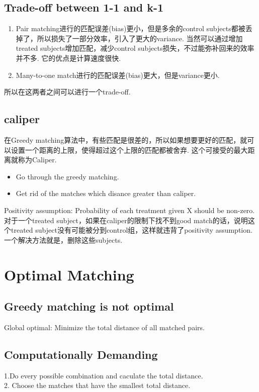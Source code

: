 \subsection{Trade-off between 1-1 and k-1}
\begin{enumerate}[itemindent=2em,label=(\arabic*)] 
	\item Pair matching进行的匹配误差(bias)更小，但是多余的control subjects都被丢掉了，所以损失了一部分效率，引入了更大的variance. 当然可以通过增加treated subjects增加匹配，减少control subjects损失，不过能弥补回来的效率并不多. 它的优点是计算速度很快.
	\item Many-to-one match进行的匹配误差(bias)更大，但是variance更小. 
\end{enumerate}
所以在这两者之间可以进行一个trade-off.

\subsection{caliper}
在Greedy matching算法中，有些匹配是很差的，所以如果想要更好的匹配，就可以设置一个距离的上限，使得超过这个上限的匹配都被舍弃. 这个可接受的最大距离就称为Caliper.
\begin{itemize}
	\item Go through the greedy matching.
	\item Get rid of the matches which disance greater than caliper.
\end{itemize}

Positivity assumption: Probability of each treatment given X should be non-zero.
对于一个treated subject，如果在caliper的限制下找不到good match的话，说明这个treated subject没有可能被分到control组，这样就违背了positivity assumption. 一个解决方法就是，删除这些subjects. 

\section{Optimal Matching}
\label{optimal}
\subsection{Greedy matching is not optimal}
Global optimal: Minimize the total distance of all matched pairs.
\subsection{Computationally Demanding}
1.Do every possible combination and caculate the total distance. \\
2. Choose the matches that have the smallest total distance.

